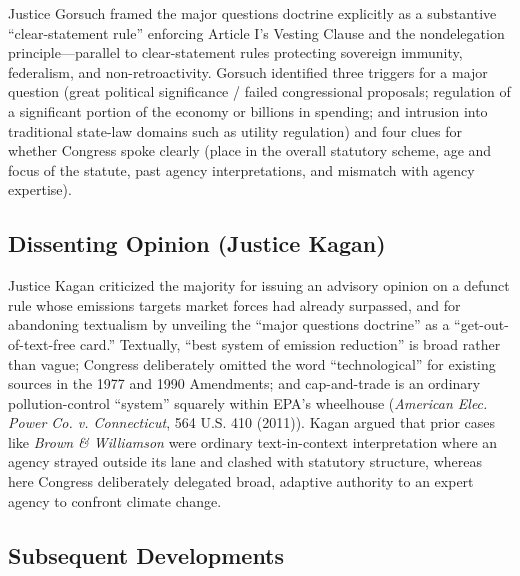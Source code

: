 \documentclass[12pt]{article}
\begin{document}
Justice Gorsuch framed the major questions doctrine explicitly as a substantive ``clear-statement rule'' enforcing Article I's Vesting Clause and the nondelegation principle---parallel to clear-statement rules protecting sovereign immunity, federalism, and non-retroactivity. Gorsuch identified three triggers for a major question (great political significance / failed congressional proposals; regulation of a significant portion of the economy or billions in spending; and intrusion into traditional state-law domains such as utility regulation) and four clues for whether Congress spoke clearly (place in the overall statutory scheme, age and focus of the statute, past agency interpretations, and mismatch with agency expertise).

\subsection{Dissenting Opinion (Justice Kagan)}

Justice Kagan criticized the majority for issuing an advisory opinion on a defunct rule whose emissions targets market forces had already surpassed, and for abandoning textualism by unveiling the ``major questions doctrine'' as a ``get-out-of-text-free card.'' Textually, ``best system of emission reduction'' is broad rather than vague; Congress deliberately omitted the word ``technological'' for existing sources in the 1977 and 1990 Amendments; and cap-and-trade is an ordinary pollution-control ``system'' squarely within EPA's wheelhouse (\textit{American Elec. Power Co. v. Connecticut}, 564 U.S. 410 (2011)). Kagan argued that prior cases like \textit{Brown \& Williamson} were ordinary text-in-context interpretation where an agency strayed outside its lane and clashed with statutory structure, whereas here Congress deliberately delegated broad, adaptive authority to an expert agency to confront climate change.

\subsection{Subsequent Developments}
\end{document}
